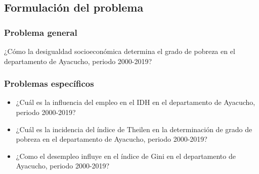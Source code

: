 \subsection{Formulación del problema}

\subsubsection{Problema general}

¿Cómo la desigualdad socioeconómica determina el grado de pobreza en el departamento de Ayacucho, periodo 2000-2019?

\subsubsection{Problemas específicos }

\begin{itemize}

\item ¿Cuál es la influencia del empleo en el IDH en el departamento de Ayacucho, periodo 2000-2019?

\item ¿Cuál es la incidencia del índice de Theilen en la determinación de grado de pobreza en el departamento de Ayacucho, periodo 2000-2019?

\item ¿Como el desempleo influye en el índice de Gini en el departamento de Ayacucho, periodo 2000-2019? 

\end{itemize}

